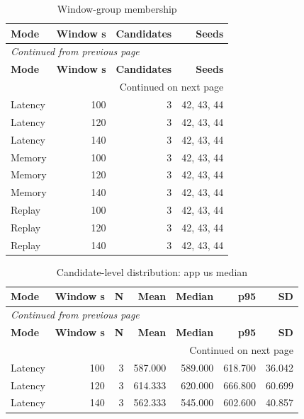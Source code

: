 \documentclass[10pt,a4paper]{article}
\begin{document}
\begingroup\small\setlength{\tabcolsep}{4pt}\renewcommand{\arraystretch}{1.12}
\begin{longtable}{@{}lrrr@{}}
\caption{Window-group membership}\\
\toprule
\textbf{Mode} & \textbf{Window s} & \textbf{Candidates} & \textbf{Seeds} \\
\midrule\endfirsthead
\multicolumn{4}{l}{\small\itshape Continued from previous page}\\
\toprule
\textbf{Mode} & \textbf{Window s} & \textbf{Candidates} & \textbf{Seeds} \\
\midrule\endhead
\midrule\multicolumn{4}{r}{\small Continued on next page}\\\endfoot
\bottomrule\endlastfoot
Latency & 100 & 3 & 42, 43, 44 \\
Latency & 120 & 3 & 42, 43, 44 \\
Latency & 140 & 3 & 42, 43, 44 \\
Memory & 100 & 3 & 42, 43, 44 \\
Memory & 120 & 3 & 42, 43, 44 \\
Memory & 140 & 3 & 42, 43, 44 \\
Replay & 100 & 3 & 42, 43, 44 \\
Replay & 120 & 3 & 42, 43, 44 \\
Replay & 140 & 3 & 42, 43, 44 \\
\end{longtable}\endgroup
\begingroup\small\setlength{\tabcolsep}{4pt}\renewcommand{\arraystretch}{1.12}
\begin{longtable}{@{}lrrrrrr@{}}
\caption{Candidate-level distribution:\allowbreak{} app us median}\\
\toprule
\textbf{Mode} & \textbf{Window s} & \textbf{N} & \textbf{Mean} & \textbf{Median} & \textbf{p95} & \textbf{SD} \\
\midrule\endfirsthead
\multicolumn{7}{l}{\small\itshape Continued from previous page}\\
\toprule
\textbf{Mode} & \textbf{Window s} & \textbf{N} & \textbf{Mean} & \textbf{Median} & \textbf{p95} & \textbf{SD} \\
\midrule\endhead
\midrule\multicolumn{7}{r}{\small Continued on next page}\\\endfoot
\bottomrule\endlastfoot
Latency & 100 & 3 & 587.000 & 589.000 & 618.700 & 36.042 \\
Latency & 120 & 3 & 614.333 & 620.000 & 666.800 & 60.699 \\
Latency & 140 & 3 & 562.333 & 545.000 & 602.600 & 40.857 \\
\end{longtable}\endgroup
\end{document}
